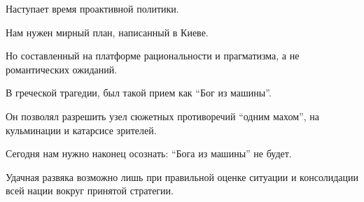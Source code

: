 Наступает время проактивной политики. 

Нам нужен мирный план, написанный в Киеве. 

Но составленный на платформе рациональности и прагматизма, а не романтических
ожиданий.

В греческой трагедии, был такой прием как \enquote{Бог из машины}. 

Он позволял разрешить узел сюжетных противоречий \enquote{одним махом}, на
кульминации и катарсисе зрителей.

Сегодня нам нужно наконец осознать: \enquote{Бога из машины} не будет.

Удачная развяка возможно лишь при правильной оценке ситуации и консолидации
всей нации вокруг принятой стратегии.
